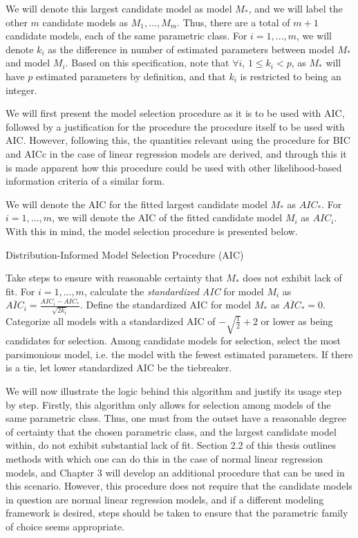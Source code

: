 		We will denote this largest candidate model as model $M_*$, and we will label the other $m$ candidate models as $M_1,...,M_m$. Thus, there are a total of $m+1$ candidate
		models, each of the same parametric class. For $i=1,...,m$, we will denote $k_i$ as the difference in number of estimated parameters between model $M_*$ and model
		$M_i$. Based on this specification, note that $\forall i$, $1 \le k_i < p$, as $M_*$ will have $p$ estimated parameters by definition, and that $k_i$ is restricted to
		being an integer.

		We will first present the model selection procedure as it is to be used with AIC, followed by a justification for the procedure the procedure itself to be used with
		AIC. However, following this, the quantities relevant using the procedure for BIC and AICc in the case of linear regression models are derived, and through this
		it is made apparent how this procedure could be used with other likelihood-based information criteria of a similar form.

		We will denote the AIC for the fitted largest candidate model $M_*$ as $AIC_*$. For $i=1,...,m$, we will denote the AIC of the fitted candidate model $M_i$ as 
		$AIC_i$. With this in mind, the model selection procedure is presented below.

		\pagebreak

		\begin{algorithm}[H]
			\caption{Distribution-Informed Model Selection Procedure (AIC)}
			\begin{algorithmic}[1]
			  \State Take steps to ensure with reasonable certainty that $M_*$ does not exhibit lack of fit.
			  \State For $i = 1,...,m$, calculate the \textit{standardized AIC} for model $M_i$ as 
			  $\overline{AIC}_i = \frac{AIC_i - AIC_*}{\sqrt{2k_i}}$. Define the standardized AIC for model
			  $M_*$ as $\overline{AIC}_* = 0$.
			  \State Categorize all models with a standardized AIC of $ -\sqrt{\frac{1}{2}} + 2$ or lower as
			  being candidates for selection.
			  \State Among candidate models for selection, select the most parsimonious model, i.e. the model
			  with the fewest estimated parameters. If there is a tie, let lower standardized AIC be the
			  tiebreaker.
			\end{algorithmic}
		\end{algorithm}

		We will now illustrate the logic behind this algorithm and justify its usage step by step. Firstly, this algorithm only allows for selection among models of the
		same parametric class. Thus, one must from the outset have a reasonable degree of certainty that the chosen parametric class, and the largest candidate model
		within, do not exhibit substantial lack of fit. Section 2.2 of this thesis outlines methods with which one can do this in the case of normal linear regression
		models, and Chapter 3 will develop an additional procedure that can be used in this scenario. However, this procedure does not require that the candidate models
		in question are normal linear regression models, and if a different modeling framework is desired, steps should be taken to ensure that the parametric family
		of choice seems appropriate.

